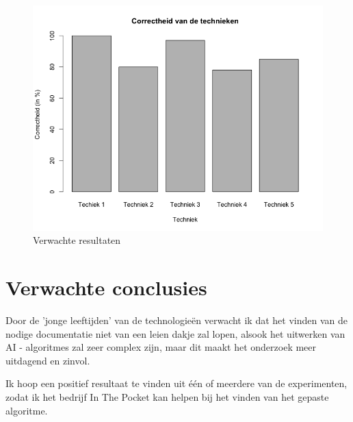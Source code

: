 \begin{figure}[H]
	\centering
	\includegraphics[scale=0.5]{Correctheid_technieken}
	\caption{Verwachte resultaten}
\end{figure}

\section{Verwachte conclusies}
\label{sec:verwachte_conclusies}
Door de 'jonge leeftijden' van de technologieën verwacht ik dat het vinden van de nodige documentatie niet van een leien dakje zal lopen, alsook het uitwerken van AI - algoritmes zal zeer complex zijn, maar dit maakt het onderzoek meer uitdagend en zinvol.

Ik hoop een positief resultaat te vinden uit één of meerdere van de experimenten, zodat ik het bedrijf In The Pocket kan helpen bij het vinden van het gepaste algoritme.
